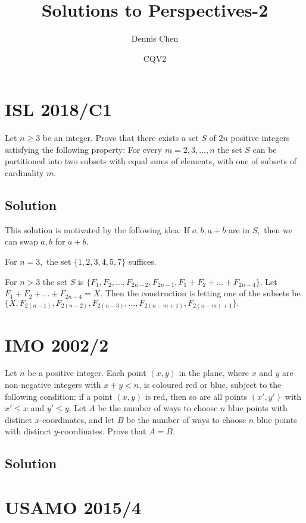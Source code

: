 \documentclass{article}
\title{Solutions to Perspectives-2}
\author{Dennis Chen}
\date{CQV2}
\begin{document}
\maketitle

\toc

\pagebreak\section{ISL 2018/C1}
Let $n\geq 3$ be an integer. Prove that there exists a set $S$ of $2n$ positive integers satisfying the following property: For every $m=2,3,...,n$ the set $S$ can be partitioned into two subsets with equal sums of elements, with one of subsets of cardinality $m.$

\subsection{Solution}
This solution is motivated by the following idea: If $a,b,a+b$ are in $S,$ then we can swap $a,b$ for $a+b$.

For $n=3,$ the set $\{1,2,3,4,5,7\}$ suffices.

For $n>3$ the set $S$ is $\{F_1,F_2,\ldots,F_{2n-2},F_{2n-1},F_{1}+F_{2}+\ldots+F_{2n-4}\}.$ Let $F_1+F_2+\ldots+F_{2n-4}=X.$ Then the construction is letting one of the subsets be $\{X,F_{2(n-1)},F_{2(n-2)},F_{2(n-3)},\ldots,F_{2(n-m+1)},F_{2(n-m)+1}\}.$

\pagebreak\section{IMO 2002/2}
Let $n$ be a positive integer. Each point $(x,y)$ in the plane, where $x$ and $y$ are non-negative integers with $x+y<n$, is coloured red or blue, subject to the following condition: if a point $(x,y)$ is red, then so are all points $(x',y')$ with $x'\leq x$ and $y'\leq y$. Let $A$ be the number of ways to choose $n$ blue points with distinct $x$-coordinates, and let $B$ be the number of ways to choose $n$ blue points with distinct $y$-coordinates. Prove that $A=B$.

\subsection{Solution}

\pagebreak\section{USAMO 2015/4}
\end{document}
